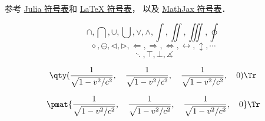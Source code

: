 
参考 \href{https://docs.julialang.org/en/v1/manual/unicode-input/}{Julia 符号表}和 \href{https://oeis.org/wiki/List_of_LaTeX_mathematical_symbols}{LaTeX 符号表}， 以及 \href{http://www.onemathematicalcat.org/MathJaxDocumentation/TeXSyntax.htm#U}{MathJax 符号表}．

\begin{equation}
\cap, \bigcap, \cup, \bigcup, \vee, \wedge, \int, \iint, \iiint, \oint
\end{equation}
\begin{equation}
\diamond, \ominus, \triangleleft, \triangleright, \Longleftarrow, \Longrightarrow, \iff, \leftrightarrow, \updownarrow, \cdots
\end{equation}
\begin{equation}
\ddots, \top, \bot, \measuredangle
\end{equation}

\begin{equation}
\qty(\frac{1}{\sqrt{1-v^2/c^2}}, \quad \frac{1}{\sqrt{1-v^2/c^2}}, \quad \frac{1}{\sqrt{1-v^2/c^2}}, \quad 0)\Tr
\end{equation}

\begin{equation}
\pmat{\frac{1}{\sqrt{1-v^2/c^2}}, \quad \frac{1}{\sqrt{1-v^2/c^2}}, \quad \frac{1}{\sqrt{1-v^2/c^2}}, \quad 0}\Tr
\end{equation}

